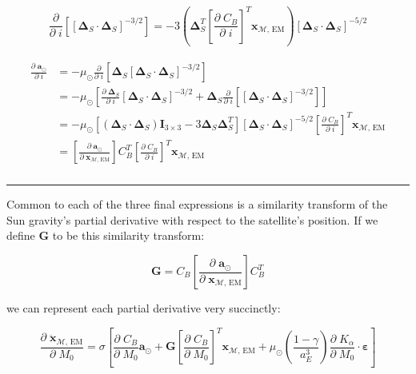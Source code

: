 \documentclass[]{article}
\newcommand{\pd}[2]{\frac{\partial\;#1}{\partial\;#2}}
\newcommand{\pddown}[2]{\frac{\partial}{\partial\;#2} \left[ #1 \right] }
\begin{document}
	\begin{equation*}
		\pddown{ [\boldsymbol{\Delta}_S \cdot \boldsymbol{\Delta}_S]^{-3/2} }{i} = -3 \left( \boldsymbol{\Delta}_S^T \left[ \pd{C_B}{i} \right]^T \mathbf{x}_{\mathcal{M}\text{, EM}} \right) [\boldsymbol{\Delta}_S \cdot \boldsymbol{\Delta}_S]^{-5/2}
	\end{equation*}
	
	\begin{align}
	\begin{split}
		\pd{\mathbf{a}_{\odot}}{i} 
		&= -\mu_\odot \pddown{ \boldsymbol{\Delta}_S [\boldsymbol{\Delta}_S \cdot \boldsymbol{\Delta}_S]^{-3/2} }{i} \\
		&= -\mu_\odot \left[ \pd{ \boldsymbol{\Delta}_S }{i}[\boldsymbol{\Delta}_S \cdot \boldsymbol{\Delta}_S]^{-3/2} + \boldsymbol{\Delta}_S  \pddown{ [\boldsymbol{\Delta}_S \cdot \boldsymbol{\Delta}_S]^{-3/2} }{i} \right] \\
		&= -\mu_\odot \left[ (\boldsymbol{\Delta}_S \cdot \boldsymbol{\Delta}_S)\mathbf{I}_{3\times 3} - 3 \boldsymbol{\Delta}_S \boldsymbol{\Delta}_S^T \right] [\boldsymbol{\Delta}_S \cdot \boldsymbol{\Delta}_S]^{-5/2} \left[ \pd{C_B}{i} \right]^T \mathbf{x}_{\mathcal{M}\text{, EM}} \\
		&= \left[\pd{\mathbf{a}_{\odot}}{ \mathbf{x}_{\mathcal{M}\text{, EM}} }\right] C_B^T \left[ \pd{C_B}{i} \right]^T \mathbf{x}_{\mathcal{M}\text{, EM}} \\
	\end{split}
	\end{align}
	
	\hrule \vspace{1em}
	
	Common to each of the three final expressions is a similarity transform of the Sun gravity's partial derivative with respect to the satellite's position.  If we define $\mathbf{G}$ to be this similarity transform:
	
	\begin{equation*}
		\mathbf{G} = C_B \left[\pd{\mathbf{a}_{\odot}}{ \mathbf{x}_{\mathcal{M}\text{, EM}} }\right] C_B^T
	\end{equation*}
	
	we can represent each partial derivative very succinctly:
	
	
	\begin{equation}
		\pd{\ddot{\mathbf{x}}_{\mathcal{M}\text{, EM}}}{M_0} = \sigma \left[ \pd{C_B}{M_0} \mathbf{a}_{\odot} + \mathbf{G} \left[ \pd{C_B}{M_0} \right]^T \mathbf{x}_{\mathcal{M}\text{, EM}} + \mu_\odot \left(\frac{1-\gamma}{a_E^3}\right) \pd{K_\alpha}{M_0} \cdot \boldsymbol{\varepsilon} \right]
	\end{equation}
	
\end{document}
